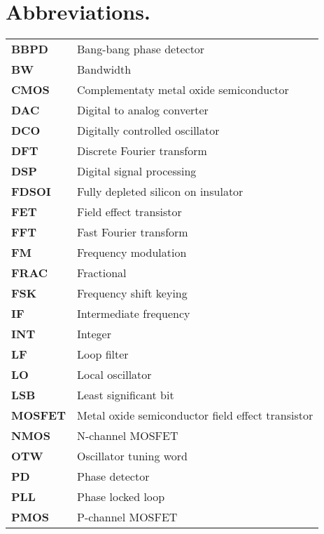 	\pagebreak
	\null\pagebreak
	\section*{Abbreviations.}

	\begin{tabular}{@{}ll}
		\textbf{\textsf{BBPD}} & Bang-bang phase detector 	\\
		\textbf{\textsf{BW}} &  Bandwidth	\\
		\textbf{\textsf{CMOS}} & Complementaty metal oxide semiconductor 	\\
		\textbf{\textsf{DAC}}& 	Digital to analog converter\\
		\textbf{\textsf{DCO}}& 	Digitally controlled oscillator\\
		\textbf{\textsf{DFT}}& 	Discrete Fourier transform\\
		\textbf{\textsf{DSP}} &  Digital signal processing	\\
		\textbf{\textsf{FDSOI}} &  Fully depleted silicon on insulator	\\
		\textbf{\textsf{FET}} &  Field effect transistor	\\
		\textbf{\textsf{FFT}} &  Fast Fourier transform	\\
		\textbf{\textsf{FM}} &  Frequency modulation	\\
		\textbf{\textsf{FRAC}} & Fractional 	\\
		\textbf{\textsf{FSK}} &  Frequency shift keying	\\
		\textbf{\textsf{IF}} &  Intermediate frequency	\\
		\textbf{\textsf{INT}} & Integer	\\
		\textbf{\textsf{LF}} &  Loop filter	\\
		\textbf{\textsf{LO}} &  Local oscillator	\\
		\textbf{\textsf{LSB}} &  Least significant bit	\\
		\textbf{\textsf{MOSFET}} & Metal oxide semiconductor field effect transistor	\\
		\textbf{\textsf{NMOS}} & N-channel MOSFET 	\\
		\textbf{\textsf{OTW}} &  Oscillator tuning word	\\
		\textbf{\textsf{PD}} &  Phase detector	\\
		\textbf{\textsf{PLL}} &  Phase locked loop	\\
		\textbf{\textsf{PMOS}} &  P-channel MOSFET	\\

\end{tabular}
